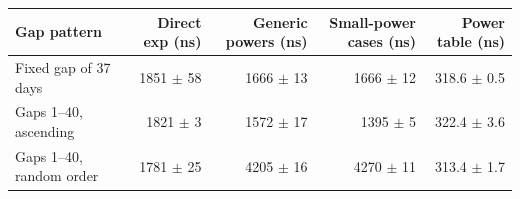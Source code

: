 \begin{tabular}{lrrrr}
\toprule
Gap pattern & Direct exp (ns) & Generic powers (ns) & Small-power cases (ns) & Power table (ns) \\
\midrule
Fixed gap of 37 days & 1851 $\pm$ 58 & 1666 $\pm$ 13 & 1666 $\pm$ 12 & 318.6 $\pm$ 0.5 \\
Gaps 1--40, ascending & 1821 $\pm$ 3 & 1572 $\pm$ 17 & 1395 $\pm$ 5 & 322.4 $\pm$ 3.6 \\
Gaps 1--40, random order & 1781 $\pm$ 25 & 4205 $\pm$ 16 & 4270 $\pm$ 11 & 313.4 $\pm$ 1.7 \\
\bottomrule
\end{tabular}
